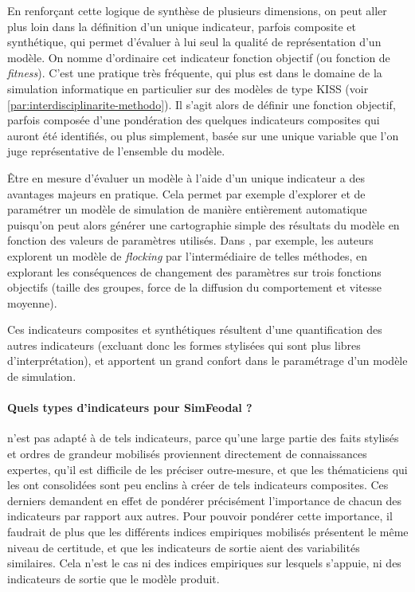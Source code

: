 En renforçant cette logique de synthèse de plusieurs dimensions, on peut aller plus loin dans la définition d'un unique indicateur, parfois composite et synthétique, qui permet d'évaluer à lui seul la qualité de représentation d'un modèle.
On nomme d'ordinaire cet indicateur \og fonction objectif\fg{} (ou \og fonction de \textit{fitness}\fg{}).
C'est une pratique très fréquente, qui plus est dans le domaine de la simulation informatique en particulier sur des modèles de type \og KISS\fg{} (voir \cref{par:interdisciplinarite-methodo}).
Il s'agit alors de définir une \og fonction objectif\fg{}, parfois composée d'une pondération des quelques indicateurs composites qui auront été identifiés, ou plus simplement, basée sur une unique variable que l'on juge représentative de l'ensemble du modèle.

Être en mesure d'évaluer un modèle à l'aide d'un unique indicateur a des avantages majeurs en pratique.
Cela permet par exemple d'explorer et de paramétrer un modèle de simulation de manière entièrement automatique puisqu'on peut alors générer une cartographie simple des résultats du modèle en fonction des valeurs de paramètres utilisés.
Dans \textcite{cherel_beyond_2015}, par exemple, les auteurs explorent un modèle de \og \textit{flocking}\fg{} par l'intermédiaire de telles méthodes, en explorant les conséquences de changement des paramètres sur trois fonctions objectifs (taille des groupes, force de la diffusion du comportement et vitesse moyenne).

Ces indicateurs composites et synthétiques résultent d'une quantification des autres indicateurs (excluant donc les formes stylisées qui sont plus libres d'interprétation), et apportent un grand confort dans le paramétrage d'un modèle de simulation.

\paragraph{Quels types d'indicateurs pour SimFeodal ?}\label{par:indicateurs-simfeodal}

\simfeodal{} n'est pas adapté à de tels indicateurs, parce qu'une large partie des faits stylisés et ordres de grandeur mobilisés proviennent directement de connaissances expertes, qu'il est difficile de les préciser outre-mesure, et que les thématiciens qui les ont consolidées sont peu enclins à créer de tels indicateurs composites.
Ces derniers demandent en effet de pondérer précisément l'importance de chacun des indicateurs par rapport aux autres.
Pour pouvoir pondérer cette importance, il faudrait de plus que les différents indices empiriques mobilisés présentent le même niveau de certitude, et que les indicateurs de sortie aient des variabilités similaires.
Cela n'est le cas ni des indices empiriques sur lesquels \simfeodal{} s'appuie, ni des indicateurs de sortie que le modèle produit.

